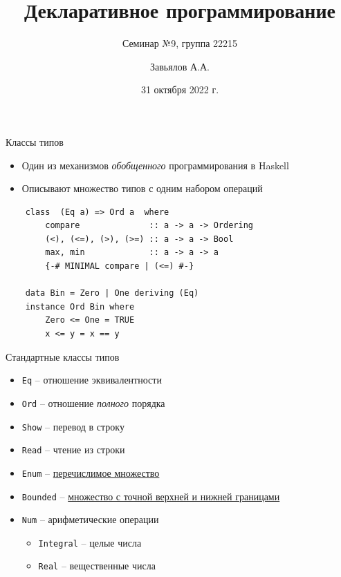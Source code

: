 \documentclass{beamer}
\title{Декларативное программирование}
\subtitle{Семинар №9, группа 22215}
\author{Завьялов А.А.}
\date{31 октября 2022 г.}
\institute{Кафедра систем информатики ФИТ НГУ}
\begin{document}
  \maketitle
  \begin{frame}[fragile]{Классы типов}
      \begin{itemize}
          \item Один из механизмов \textit{обобщенного} программирования в Haskell
          \item Описывают множество типов с одним набором операций 
      \end{itemize}
      \begin{verbatim}
    class  (Eq a) => Ord a  where
        compare              :: a -> a -> Ordering
        (<), (<=), (>), (>=) :: a -> a -> Bool
        max, min             :: a -> a -> a
        {-# MINIMAL compare | (<=) #-}
        
    data Bin = Zero | One deriving (Eq)
    instance Ord Bin where
        Zero <= One = TRUE
        x <= y = x == y
     \end{verbatim}
  \end{frame}
  \begin{frame}{Стандартные классы типов}
      \begin{itemize}
          \item \texttt{Eq} -- отношение эквивалентности
          \item \texttt{Ord} -- отношение \textit{полного} порядка
          \item \texttt{Show} -- перевод в строку
          \item \texttt{Read} -- чтение из строки
          \item \texttt{Enum} -- \href{https://en.wikipedia.org/wiki/Computably_enumerable_set}{перечислимое  множество}
          \item \texttt{Bounded} -- \href{https://en.wikipedia.org/wiki/Infimum_and_supremum}{множество с точной верхней и нижней границами}
      \end{itemize}
      \begin{itemize}
          \item \texttt{Num} -- арифметические операции
            \begin{itemize}
                \item \texttt{Integral} -- целые числа
                \item \texttt{Real} -- вещественные числа
            \end{itemize}
      \end{itemize}
  \end{frame}
\end{document}
